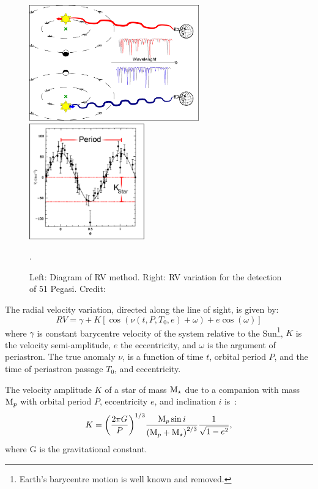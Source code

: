 \begin{figure}
    \centering
    \includegraphics[height=5cm]{./figures/introduction/RV_Diagram}
    \includegraphics[height=5cm]{./figures/introduction/PhaseFolded_51Pegb_Mayor_et_al_1995}
    \caption{Left: Diagram of {RV} method. Right: {RV} variation for the detection of {51 Pegasi}. Credit:~\citet{mayor_jupitermass_1995}}.
    \label{fig:rvdiagram-mayor}
\end{figure}

The radial velocity variation, directed along the line of sight, is given by:
\begin{equation}
\label{eq:rv_equation_intro}
{RV} = \gamma + K [\cos{(\nu(t, P, T_0, e) + \omega)} + e\cos{(\omega)}]
\end{equation}
where $\gamma$ is constant barycentre velocity of the system relative to the Sun\footnote{Earth's barycentre motion is well known and removed.}, \(K\) is the velocity semi-amplitude, \(e\) the eccentricity, and \(\omega\) is the argument of periastron.
The true anomaly \(\nu\), is a function of time \(t\), orbital period \(P\), and the time of periastron passage \(T_0\), and eccentricity.

The velocity amplitude $K$ of a star of mass $\textrm{M}_{\star}$ due to a companion with mass $\textrm{M}_{p}$ with orbital period $P$, eccentricity $e$, and inclination $i$ is~\citep[e.g.][]{cumming_lick_1999}:
\begin{equation}
    K = {\left(\frac{2\pi G}{P}\right)}^{1/3} \frac{\textrm{M}_{p}{} \sin{i}}{{(\textrm{M}_{p}{} + \textrm{M}_{\star})}^{2/3}} \frac{1}{\sqrt{1-{e}^{2}}}, \label{eq:k_amplitude}
\end{equation}
where G is the gravitational constant.

